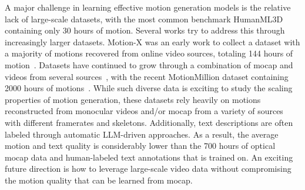 A major challenge in learning effective motion generation models is the relative lack of large-scale datasets, with the most common benchmark HumanML3D~\cite{guo2022humanml3d} containing only 30 hours of motion.
Several works try to address this through increasingly larger datasets.
Motion-X was an early work to collect a dataset with a majority of motions recovered from online video sources, totaling 144 hours of motion~\cite{lin2023motion}. Datasets have continued to grow through a combination of mocap and videos from several sources~\cite{lu2025scamo,lin2025quest,wang2025scaling,zhang2024large,hymotion2025}, with the recent MotionMillion dataset containing 2000 hours of motions~\cite{fan2025gotozero}. 
While such diverse data is exciting to study the scaling properties of motion generation, these datasets rely heavily on motions reconstructed from monocular videos and/or mocap from a variety of sources with different framerates and skeletons. Additionally, text descriptions are often labeled through automatic LLM-driven approaches.
As a result, the average motion and text quality is considerably lower than the 700 hours of optical mocap data and human-labeled text annotations that \model is trained on. An exciting future direction is how to leverage large-scale video data without compromising the motion quality that can be learned from mocap.

